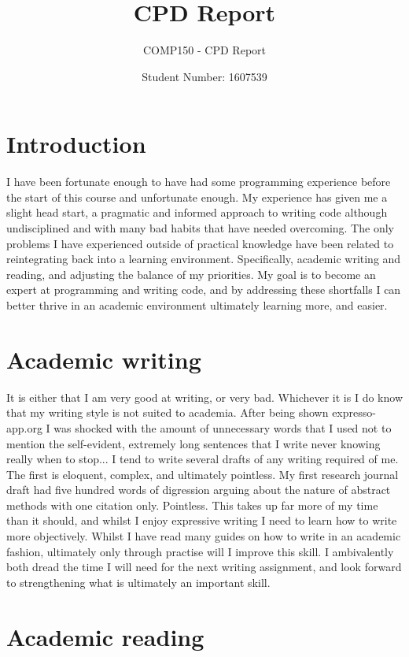 \documentclass{scrartcl}
\title{CPD Report}
\subtitle{COMP150 - CPD Report}
\author{Student Number: 1607539}
\begin{document}
\maketitle

\section{Introduction}

I have been fortunate enough to have had some programming experience before the start of this course and unfortunate enough. My experience has given me a slight head start, a pragmatic and informed approach to writing code although undisciplined and with many bad habits that have needed overcoming. The only problems I have experienced outside of practical knowledge have been related to reintegrating back into a learning environment. Specifically, academic writing and reading, and adjusting the balance of my priorities. My goal is to become an expert at programming and writing code, and by addressing these shortfalls I can better thrive in an academic environment ultimately learning more, and easier.

\section{Academic writing}

It is either that I am very good at writing, or very bad. Whichever it is I do know that my writing style is not suited to academia. After being shown expresso-app.org I was shocked with the amount of unnecessary words that I used not to mention the self-evident, extremely long sentences that I write never knowing really when to stop... I tend to write several drafts of any writing required of me. The first is eloquent, complex, and ultimately pointless. My first research journal draft had five hundred words of digression arguing about the nature of abstract methods with one citation only. Pointless. This takes up far more of my time than it should, and whilst I enjoy expressive writing I need to learn how to write more objectively. Whilst I have read many guides on how to write in an academic fashion, ultimately only through practise will I improve this skill. I ambivalently both dread the time I will need for the next writing assignment, and look forward to strengthening what is ultimately an important skill.

\section{Academic reading}
\end{document}
